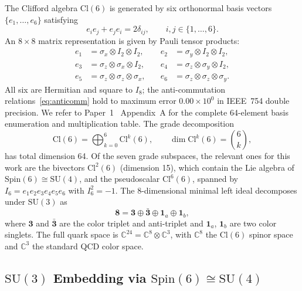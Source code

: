 \documentclass[12pt]{article}
\theoremstyle{definition}
\theoremstyle{remark}
\newcommand{\cl}{\mathrm{Cl}}           %
\newcommand{\spin}{\mathrm{Spin}}       %
\newcommand{\su}{\mathrm{SU}}           %
\newcommand{\Isix}{I_6}                              %
\begin{document}
	The Clifford algebra $\cl(6)$ is generated by six orthonormal basis vectors
	$\{e_1,\ldots,e_6\}$ satisfying
	\begin{equation}
		e_i e_j + e_j e_i = 2\delta_{ij}, \qquad i,j\in\{1,\ldots,6\}.
		\label{eq:anticomm}
	\end{equation}
	An $8\times8$ matrix representation is given by Pauli tensor products:
	\begin{equation}
		\begin{aligned}
			e_1 &= \sigma_x\otimes I_2\otimes I_2, &\quad
			e_2 &= \sigma_y\otimes I_2\otimes I_2, \\
			e_3 &= \sigma_z\otimes\sigma_x\otimes I_2, &\quad
			e_4 &= \sigma_z\otimes\sigma_y\otimes I_2, \\
			e_5 &= \sigma_z\otimes\sigma_z\otimes\sigma_x, &\quad
			e_6 &= \sigma_z\otimes\sigma_z\otimes\sigma_y.
		\end{aligned}
		\label{eq:basis}
	\end{equation}
	All six are Hermitian and square to $I_8$; the anti-commutation
	relations~\eqref{eq:anticomm} hold to maximum error $0.00\times10^0$ in
	IEEE~754 double precision.  We refer to Paper~1~\cite{FirestoneP1}
	Appendix~A for the complete 64-element basis enumeration and multiplication
	table.  The grade decomposition
	\begin{equation}
		\cl(6) = \bigoplus_{k=0}^{6} \cl^k(6), \qquad
		\dim \cl^k(6) = \binom{6}{k},
		\label{eq:grade-decomp}
	\end{equation}
	has total dimension 64.  Of the seven grade subspaces, the relevant ones for
	this work are the bivectors $\cl^2(6)$ (dimension 15), which contain the Lie
	algebra of $\spin(6)\cong\su(4)$, and the pseudoscalar $\cl^6(6)$, spanned
	by $\Isix = e_1 e_2 e_3 e_4 e_5 e_6$ with $\Isix^2 = -1$.  The 8-dimensional
	minimal left ideal decomposes under $\su(3)$ as
	\begin{equation}
		\mathbf{8} = \mathbf{3} \oplus \bar{\mathbf{3}} \oplus \mathbf{1}_a
		\oplus \mathbf{1}_b,
		\label{eq:spinor-decomp}
	\end{equation}
	where $\mathbf{3}$ and $\bar{\mathbf{3}}$ are the color triplet and
	anti-triplet and $\mathbf{1}_a$, $\mathbf{1}_b$ are two color singlets.
	The full quark space is $\mathbb{C}^{24} = \mathbb{C}^8\otimes\mathbb{C}^3$,
	with $\mathbb{C}^8$ the $\cl(6)$ spinor space and $\mathbb{C}^3$ the
	standard QCD color space.
	
	\subsection{\texorpdfstring{$\su(3)$}{SU(3)} Embedding via
		\texorpdfstring{$\spin(6)\cong\su(4)$}{Spin(6)≅SU(4)}}
	\label{sec:embedding}
	
\end{document}
